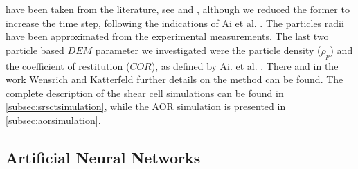 have been taken from the literature, see \cite{RefWorks:175} and \cite{RefWorks:176}, 
although we reduced the former to increase the time step, following the indications of Ai et al. \cite{RefWorks:131}. 
The particles radii have been approximated from the experimental measurements. 
The last two particle based $DEM$ parameter we investigated were the particle density 
($\rho_p$) and the coefficient of restitution ($COR$), as defined by Ai. et al. \cite{RefWorks:131}. 
There and in the work Wensrich and Katterfeld \cite{RefWorks:87} further details on the method can be found.
The complete description of the shear cell simulations can be found in \ref{subsec:srsctsimulation}, 
while the AOR simulation is presented in \ref{subsec:aorsimulation}.\\

\subsection{Artificial Neural Networks}
\label{subsec:ann}

